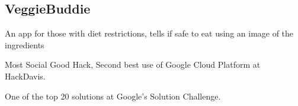 \documentclass[]{deedy-resume-openfont}
\begin{document}
\begin{minipage}[t]{0.66\textwidth}
\subsection*{VeggieBuddie}
\begin{tightemize}
\item An app for those with diet restrictions, tells if safe to eat using an image of the ingredients
\item Most Social Good Hack, Second best use of Google Cloud Platform at HackDavis.
\item One of the top 20 solutions at Google’s Solution Challenge.
\end{tightemize}


\end{minipage} 
\end{document}
